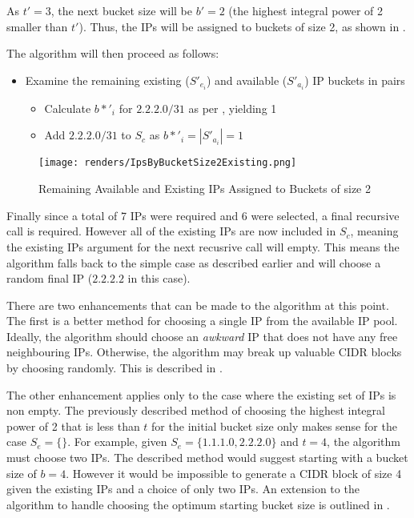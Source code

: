 As $t'=3$, the next bucket size will be $b' = 2$ (the highest integral power of 2 smaller than $t'$). Thus, the IPs will be assigned to buckets of size 2, as shown in .

The algorithm will then proceed as follows:
\begin{itemize}
\item{Examine the remaining existing ($S'_{e_i}$) and available ($S'_{a_i}$) IP buckets in pairs}
\begin{itemize}
\item{Calculate $b*'_i$ for $2.2.2.0/31$ as per , yielding 1}
\item{Add $2.2.2.0/31$ to $S_c$ as $b*'_i = |S'_{a_i}| = 1$} 
\end{itemize}
\end{itemize}

\begin{figure}[H]
      \centering
      \texttt{[image: renders/IpsByBucketSize2Existing.png]}
      \caption{Remaining Available and Existing IPs Assigned to Buckets of size 2}
      \label{fig:ipsByBucketExisting2}
\end{figure}

Finally since a total of 7 IPs were required and 6 were selected, a final recursive call is required. However all of the existing IPs are now included in $S_c$, meaning the existing IPs argument for the next recusrive call will empty. This means the algorithm falls back to the simple case as described earlier and will choose a random final IP ($2.2.2.2$ in this case). 

There are two enhancements that can be made to the algorithm at this point. The first is a better method for choosing a single IP from the available IP pool. Ideally, the algorithm should choose an \textit{awkward} IP that does not have any free neighbouring IPs. Otherwise, the algorithm may break up valuable CIDR blocks by choosing randomly. This is described in . 

The other enhancement applies only to the case where the existing set of IPs is non empty. The previously described method of choosing the highest integral power of 2 that is less than $t$ for the initial bucket size only makes sense for the case $S_e = \{\}$. For example, given $S_e = \{1.1.1.0, 2.2.2.0\}$ and $t = 4$, the algorithm must choose two IPs. The described method would suggest starting with a bucket size of $b=4$. However it would be impossible to generate a CIDR block of size 4 given the existing IPs and a choice of only two IPs. An extension to the algorithm to handle choosing the optimum starting bucket size is outlined in . 

